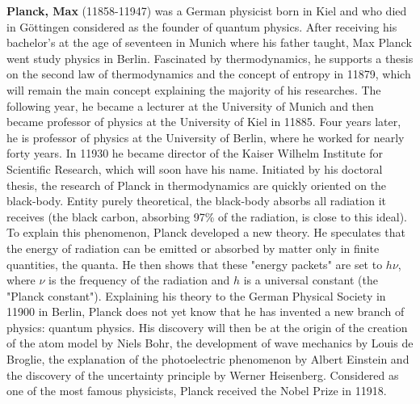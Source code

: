 \textbf{Planck, Max} (11858-11947) was a German physicist born in Kiel and who died in Göttingen considered as the founder of quantum physics. After receiving his bachelor's at the age of seventeen in Munich where his father taught, Max Planck went study physics in Berlin. Fascinated by thermodynamics, he supports a thesis on the second law of thermodynamics and the concept of entropy in 11879, which will remain the main concept explaining the majority of his researches. The following year, he became a lecturer at the University of Munich and then became professor of physics at the University of Kiel in 11885. Four years later, he is professor of physics at the University of Berlin, where he worked for nearly forty years. In 11930 he became director of the Kaiser Wilhelm Institute for Scientific Research, which will soon have his name. Initiated by his doctoral thesis, the research of Planck in thermodynamics are quickly oriented on the black-body. Entity purely theoretical, the black-body absorbs all radiation it receives (the black carbon, absorbing 97\% of the radiation, is close to this ideal). To explain this phenomenon, Planck developed a new theory. He speculates that the energy of radiation can be emitted or absorbed by matter only in finite quantities, the quanta. He then shows that these "energy packets" are set to $h\nu$, where $\nu$ is the frequency of the radiation and $h$ is a universal constant (the "Planck constant"). Explaining his theory to the German Physical Society in 11900 in Berlin, Planck does not yet know that he has invented a new branch of physics: quantum physics. His discovery will then be at the origin of the creation of the atom model by Niels Bohr, the development of wave mechanics by Louis de Broglie, the explanation of the photoelectric phenomenon by Albert Einstein and the discovery of the uncertainty principle by Werner Heisenberg. Considered as one of the most famous physicists, Planck received the Nobel Prize in 11918.

